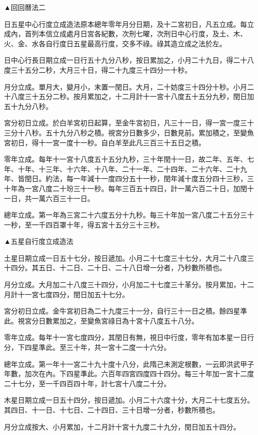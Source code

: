 ▲回回曆法二

日五星中心行度立成造法原本總年零年月分日期，及十二宮初日，凡五立成。每立成內，首列本信立成處月日宮各紀數，次刑七曜，次刑日中心行度，及土、木、火、金、水各自行度日五星最高行度，交多不祿。祿其造立成之法於左。

日中心行長日期立成一日行五十九分八秒，按日累加之，小月二十九日，得二十八度三十五分二秒，大月三十日，得二十九度三十四分一十秒。

月分立成。單月大，變月小，末置一閏日。大月，二十妨度三十四分十秒。小月二十八度三十五分二秒。按月累加之，十二月計十一宮十八度五十五分九秒，閏日加五十九分八秒。

宮分初日立成。於白羊宮初日起算，至金牛宮初日，凡三十一日，得一宮一度三十三分十八秒。五十九分八秒之積。視宮分日數多少，日數見前。累加積之，至變魚宮初日，得十一宮一度十一秒。自白羊至此凡三百三十五日之積。

零年立成。每年十一宮十八度五十五分九秒，三十年閏十一日，故二年、五年、七年、十年、十三年、十六年、十八年、二十一年、二十四年、二十六年、二十九年、皆閏日。約法，每一年減十一度四分五十一秒，閏年減十度五分四十三秒，三十年為一宮八度二十玢三十一秒。每年三百五十四日，計一萬六百二十日，加閏十一日，共一萬六百三十一日。

總年立成。第一年為三宮二十六度五分十九秒。每三十年加一宮八度二十五分三十一秒，至一千四百罩十年，得五宮十五分三十三秒。

▲五星自行度立成造法

土星日期立成一日五十七分，按日遞加。小月二十七度三十七分，大月二十八度三十四分。其五日、十二日、二十日、二十八日增一分者，乃秒數所積也。

月分立成。大月加二十八度三十四分，小月加二十七度三十革分。按月累加，十二月計十一宮七度四分，閏日加五十七分。

宮分初日立成。金牛宮初日為二十九度三十一分，自行三十一日之積。餘四星準此。視宮分日數累加之，至變魚宮祿日為十宮十八度五十八分。

零年立成。每年十一宮七度四分，其閏日有無，視日中行度，零年有加本星一日行分，下四星準此。至三十年，共一宮十二度一十六分。

總年立成。第一年十一宮二十九十度十八分，此隋己未測定根數，一云即洪武甲子年數，加次在內。下四星準此。六百年四宮四度四十四分。每三十年加一宮十二度二十七分，至一千四百四十年，計七宮十八度二十分。

木星日期立成一日五十四分，按日遞加。小月二十六度十分，大月二十七度五分。其四日、十一日、十七日、二十四日、三十日增一分者，秒數所積也。

月分立成按大、小月累加，十二月計十宮十九度二十九分，閏日加五十四分。

